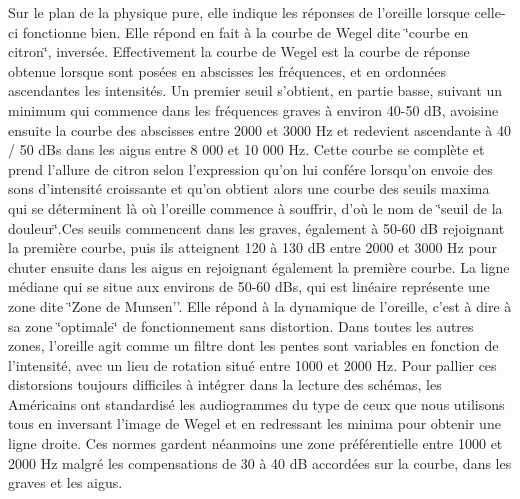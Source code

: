 \documentclass[12pt,french]{report}
\makeatletter
\let\SF@@footnote\footnote
\def\footnote{\ifx\protect\@typeset@protect
    \expandafter\SF@@footnote
  \else
    \expandafter\SF@gobble@opt
  \fi
}
\edef\SF@gobble@opt{\noexpand\protect
  \expandafter\noexpand\csname SF@gobble@opt \endcsname}
\makeatother
\begin{document}
Sur le plan de la physique pure, elle indique les réponses de l'oreille
lorsque celle-ci fonctionne bien. Elle répond en fait à la courbe
de Wegel dite \char`\"{}courbe en citron\char`\"{}, inversée.\footnote{Effectivement la courbe de Wegel est la courbe de réponse obtenue
lorsque sont posées en abscisses les fréquences, et en ordonnées ascendantes
les intensités. Un premier seuil s'obtient, en partie basse, suivant
un minimum qui commence dans les fréquences graves à environ 40-50
dB, avoisine ensuite la courbe des abscisses entre 2000 et 3000 Hz
et redevient ascendante à 40 / 50 dBs dans les aigus entre 8 000 et
10 000 Hz. Cette courbe se complète et prend l'allure de citron selon
l'expression qu'on lui confére lorsqu\textquoteright on envoie des
sons d'intensité croissante et qu'on obtient alors une courbe des
seuils maxima qui se déterminent là où l'oreille commence à souffrir,
d'où le nom de \char`\"{}seuil de la douleur\char`\"{}.Ces seuils
commencent dans les graves, également à 50-60 dB rejoignant la première
courbe, puis ils atteignent 120 à 130 dB entre 2000 et 3000 Hz pour
chuter ensuite dans les aigus en rejoignant également la première
courbe. La ligne médiane qui se situe aux environs de 50-60 dBs, qui
est linéaire représente une zone dite \char`\"{}Zone de Munsen''.
Elle répond à la dynamique de l\textquoteright oreille, c\textquoteright est
à dire à sa zone \char`\"{}optimale\char`\"{} de fonctionnement sans
distortion. Dans toutes les autres zones, l\textquoteright oreille
agit comme un filtre dont les pentes sont variables en fonction de
l\textquoteright intensité, avec un lieu de rotation situé entre 1000
et 2000 Hz. Pour pallier ces distorsions toujours difficiles à intégrer
dans la lecture des schémas, les Américains ont standardisé les audiogrammes
du type de ceux que nous utilisons tous en inversant l\textquoteright image
de Wegel et en redressant les minima pour obtenir une ligne droite.
Ces normes gardent néanmoins une zone préférentielle entre 1000 et
2000 Hz malgré les compensations de 30 à 40 dB accordées sur la courbe,
dans les graves et les aigus.}
\end{document}

